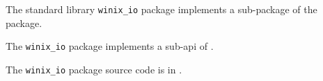 
The standard library {\tt winix\_io} package implements a sub-package of the  package.

The {\tt winix\_io} package implements a sub-api of  .

The {\tt winix\_io} package source code is in .




